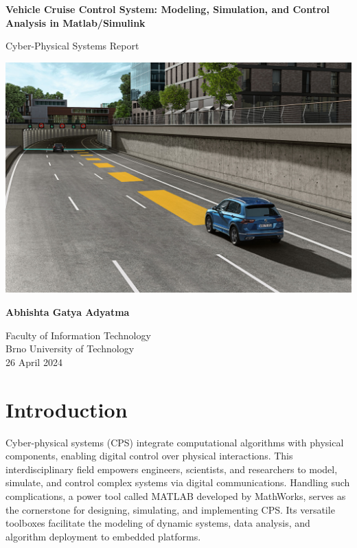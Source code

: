 \documentclass{article}
\begin{document}
\begin{titlepage}
    \begin{center}
        \vspace*{1cm}

        \Large
        \textbf{Vehicle Cruise Control System: Modeling, Simulation, and Control Analysis in Matlab/Simulink}

       \vspace{0.5cm}
        Cyber-Physical Systems Report 
            
        \vspace{1.5cm}
        \includegraphics[width=1\textwidth]{img/cc.jpeg}

       \vfill

        \textbf{Abhishta Gatya Adyatma}
            
        \vspace{0.8cm}
                 
        Faculty of Information Technology\\
        Brno University of Technology\\
        26 April 2024
            
   \end{center}
\end{titlepage}

\tableofcontents
\newpage

\section{Introduction}

Cyber-physical systems (CPS) integrate computational algorithms with physical components, enabling digital control over physical interactions. This interdisciplinary field empowers engineers, scientists, and researchers to model, simulate, and control complex systems via digital communications. Handling such complications, a power tool called MATLAB developed by MathWorks, serves as the cornerstone for designing, simulating, and implementing CPS. Its versatile toolboxes facilitate the modeling of dynamic systems, data analysis, and algorithm deployment to embedded platforms.
\end{document}
